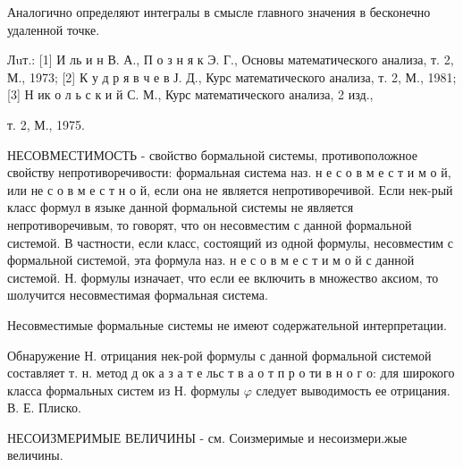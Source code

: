 \documentclass[10pt]{article}
\begin{document}
Аналогично определяют интегралы в смысле главного значения в бесконечно удаленной точке.



Лuт.: [1] И ль и н В. А., П о з н я к Э. Г., Основы математического анализа, т. 2, М., 1973; [2] К у д р я в ч е в Ј. Д., Курс математического анализа, т. 2, М., 1981; [3] Н ик о л ь с к и й С. М., Курс математического анализа, 2 изд.,

т. 2, М., 1975.



НЕСОВМЕСТИМОСТЬ - свойство бормальной системы, противоположное свойству непротиворечивости: формальная система наз. н е с о в м е с т и м о й, или не с о в м е с т н о й, если она не является непротиворечивой. Если нек-рый класс формул в языке данной формальной системы не является непротиворечивым, то говорят, что он несовместим с данной формальной системой. В частности, если класс, состоящий из одной формулы, несовместим с формальной системой, эта формула наз. н е с о в м е с т и м о й с данной системой. Н. формулы изначает, что если ее включить в множество аксиом, то шолучится несовместимая формальная система.



Несовместимые формальные системы не имеют содержательной интерпретации.



Обнаружение Н. отрицания нек-рой формулы с данной формальной системой составляет т. н. метод д ок а з а т е льс т в а о т п р о ти в н о г о: для широкого класса формальных систем из Н. формулы $\varphi$ следует выводимость ее отрицания. В. Е. Плиско.



НЕСОИЗМЕРИМЫЕ ВЕЛИЧИНЫ - см. Соизмеримые и несоизмери.жые величины.
\end{document}
